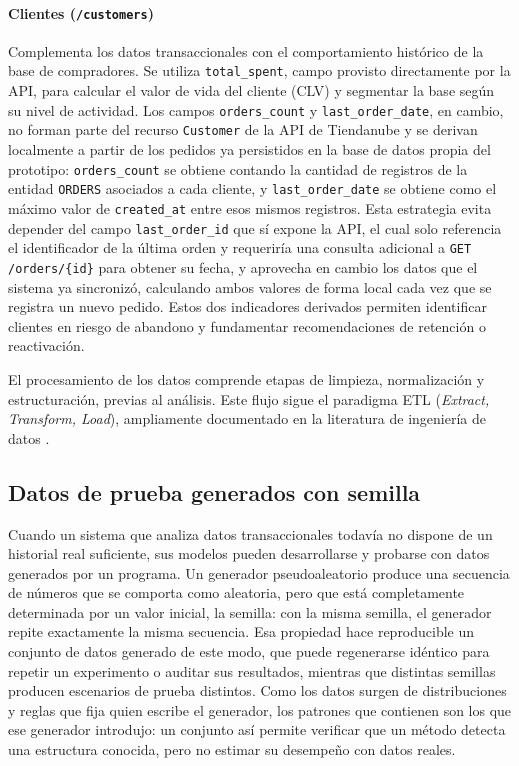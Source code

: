 \paragraph{Clientes (\texttt{/customers})}

Complementa los datos transaccionales con el comportamiento histórico de la base de compradores. Se utiliza \texttt{total\_spent}, campo provisto directamente por la API, para calcular el valor de vida del cliente (CLV) y segmentar la base según su nivel de actividad. Los campos \texttt{orders\_count} y \texttt{last\_order\_date}, en cambio, no forman parte del recurso \texttt{Customer} de la API de Tiendanube \parencite{TiendanubeAPI2024} y se derivan localmente a partir de los pedidos ya persistidos en la base de datos propia del prototipo: \texttt{orders\_count} se obtiene contando la cantidad de registros de la entidad \texttt{ORDERS} asociados a cada cliente, y \texttt{last\_order\_date} se obtiene como el máximo valor de \texttt{created\_at} entre esos mismos registros. Esta estrategia evita depender del campo \texttt{last\_order\_id} que sí expone la API, el cual solo referencia el identificador de la última orden y requeriría una consulta adicional a \texttt{GET /orders/\{id\}} para obtener su fecha, y aprovecha en cambio los datos que el sistema ya sincronizó, calculando ambos valores de forma local cada vez que se registra un nuevo pedido. Estos dos indicadores derivados permiten identificar clientes en riesgo de abandono y fundamentar recomendaciones de retención o reactivación.

El procesamiento de los datos comprende etapas de limpieza, normalización y estructuración, previas al análisis. Este flujo sigue el paradigma ETL (\emph{Extract, Transform, Load}), ampliamente documentado en la literatura de ingeniería de datos \parencite{Kimball2013}.

\subsection{Datos de prueba generados con semilla}
\label{sec:datos-semilla}

Cuando un sistema que analiza datos transaccionales todavía no dispone de un historial real suficiente, sus modelos pueden desarrollarse y probarse con datos generados por un programa. Un generador pseudoaleatorio produce una secuencia de números que se comporta como aleatoria, pero que está completamente determinada por un valor inicial, la semilla: con la misma semilla, el generador repite exactamente la misma secuencia. Esa propiedad hace reproducible un conjunto de datos generado de este modo, que puede regenerarse idéntico para repetir un experimento o auditar sus resultados, mientras que distintas semillas producen escenarios de prueba distintos. Como los datos surgen de distribuciones y reglas que fija quien escribe el generador, los patrones que contienen son los que ese generador introdujo: un conjunto así permite verificar que un método detecta una estructura conocida, pero no estimar su desempeño con datos reales.

